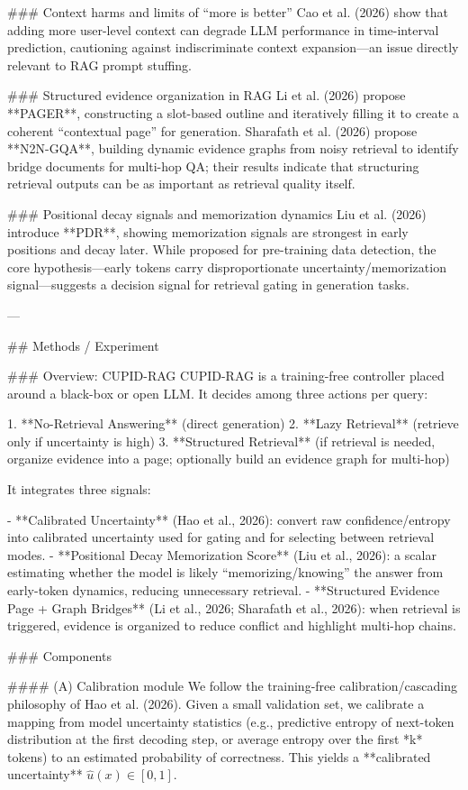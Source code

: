 ### Context harms and limits of “more is better”  
Cao et al. (2026) show that adding more user-level context can degrade LLM performance in time-interval prediction, cautioning against indiscriminate context expansion—an issue directly relevant to RAG prompt stuffing.

### Structured evidence organization in RAG  
Li et al. (2026) propose **PAGER**, constructing a slot-based outline and iteratively filling it to create a coherent “contextual page” for generation. Sharafath et al. (2026) propose **N2N-GQA**, building dynamic evidence graphs from noisy retrieval to identify bridge documents for multi-hop QA; their results indicate that structuring retrieval outputs can be as important as retrieval quality itself.

### Positional decay signals and memorization dynamics  
Liu et al. (2026) introduce **PDR**, showing memorization signals are strongest in early positions and decay later. While proposed for pre-training data detection, the core hypothesis—early tokens carry disproportionate uncertainty/memorization signal—suggests a decision signal for retrieval gating in generation tasks.

---

## Methods / Experiment  

### Overview: CUPID-RAG  
CUPID-RAG is a training-free controller placed around a black-box or open LLM. It decides among three actions per query:

1. **No-Retrieval Answering** (direct generation)  
2. **Lazy Retrieval** (retrieve only if uncertainty is high)  
3. **Structured Retrieval** (if retrieval is needed, organize evidence into a page; optionally build an evidence graph for multi-hop)

It integrates three signals:

- **Calibrated Uncertainty** (Hao et al., 2026): convert raw confidence/entropy into calibrated uncertainty used for gating and for selecting between retrieval modes.  
- **Positional Decay Memorization Score** (Liu et al., 2026): a scalar estimating whether the model is likely “memorizing/knowing” the answer from early-token dynamics, reducing unnecessary retrieval.  
- **Structured Evidence Page + Graph Bridges** (Li et al., 2026; Sharafath et al., 2026): when retrieval is triggered, evidence is organized to reduce conflict and highlight multi-hop chains.

### Components  

#### (A) Calibration module  
We follow the training-free calibration/cascading philosophy of Hao et al. (2026). Given a small validation set, we calibrate a mapping from model uncertainty statistics (e.g., predictive entropy of next-token distribution at the first decoding step, or average entropy over the first *k* tokens) to an estimated probability of correctness. This yields a **calibrated uncertainty** \( \hat{u}(x) \in [0,1] \).

